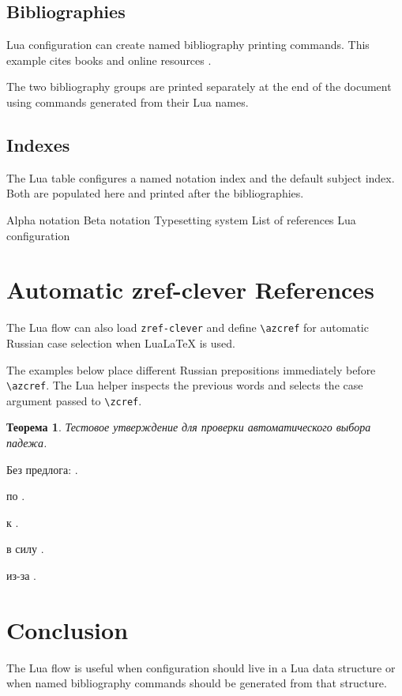 \documentclass{article}
\newtheorem{theorem}{Теорема}
\begin{document}
\subsection{Bibliographies}

Lua configuration can create named bibliography printing commands. This example
cites books \cite{knuth1984texbook,lamport1994latex} and online resources
\cite{torvalds2003git,ctan2024latex}.

The two bibliography groups are printed separately at the end of the document
using commands generated from their Lua names.

\subsection{Indexes}

The Lua table configures a named notation index and the default subject index.
Both are populated here and printed after the bibliographies.

\index[notation]{$\alpha$} Alpha notation
\index[notation]{$\beta$} Beta notation
 Typesetting system
 List of references
 Lua configuration

\section{Automatic zref-clever References}

The Lua flow can also load \texttt{zref-clever} and define \verb|\azcref| for
automatic Russian case selection when LuaLaTeX is used.

The examples below place different Russian prepositions immediately before
\verb|\azcref|.  The Lua helper inspects the previous words and selects the case
argument passed to \verb|\zcref|.

\begin{otherlanguage}{russian}
\begin{theorem}
Тестовое утверждение для проверки автоматического выбора падежа.
\end{theorem}

Без предлога: .

по .

к .

в силу .

из-за .
\end{otherlanguage}

\section{Conclusion}
\label{sec:conclusion}

The Lua flow is useful when configuration should live in a Lua data structure or
when named bibliography commands should be generated from that structure.

\printbibliographymain
\printbibliographyonline

\printindexnotation
\printindex
\end{document}

